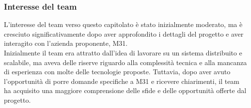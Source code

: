 \documentclass[a4paper,11pt]{article}
\begin{document}
\subsubsection{Interesse del team}
\parbox[t]{\linewidth}{%
L'interesse del team verso questo capitolato è stato inizialmente moderato, ma è cresciuto significativamente dopo aver approfondito i dettagli del progetto e aver interagito con l'azienda proponente, M31. \\
Inizialmente il team era attratto dall'idea di lavorare su un sistema distribuito e scalabile, ma aveva delle riserve riguardo alla complessità tecnica e alla mancanza di esperienza con molte delle tecnologie proposte. Tuttavia, dopo aver avuto l'opportunità di porre domande specifiche a M31 e ricevere chiarimenti, il team ha acquisito una maggiore comprensione delle sfide e delle opportunità offerte dal progetto. \\

}
\end{document}
